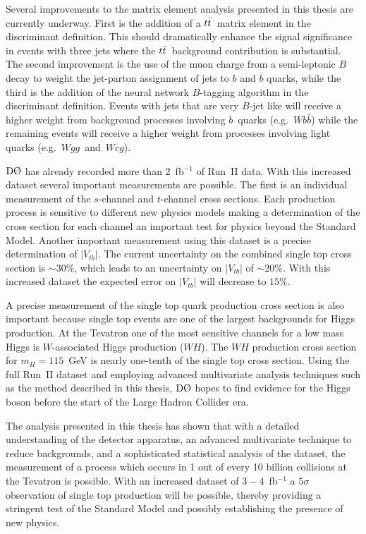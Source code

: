 Several improvements to the matrix element analysis presented in this thesis are currently underway. First is the addition of a $\mbox{$t\bar{t}$}$~matrix element in the discriminant definition. This should dramatically enhance the signal significance in events with three jets where the $\mbox{$t\bar{t}$}$~background contribution is substantial. The second improvement is the use of the muon charge from a semi-leptonic $B$ decay to weight the jet-parton assignment of jets to $b$ and $\bar{b}$ quarks, while the third is the addition of the neural network $B$-tagging algorithm in the discriminant definition. Events with jets that are very $B$-jet like will receive a higher weight from background processes involving $b$~quarks \mbox{(e.g. $Wb\bar{b}$)} while the remaining events will receive a higher weight from processes involving light quarks \mbox{(e.g. $Wgg$ and $Wcg$)}.

$\dzero$ has already recorded more than $2$~fb$^{-1}$ of Run~II data. With this increased dataset several important measurements are possible. The first is an individual measurement of the $s$-channel and $t$-channel cross sections. Each production process is sensitive to different new physics models making a determination of the cross section for each channel an important test for physics beyond the Standard Model. Another important measurement using this dataset is a precise determination of $|V_{tb}|$. The current uncertainty on the combined single top cross section is $\sim30\%$, which leads to an uncertainty on $|V_{tb}|$ of $\sim20\%$. With this increased dataset the expected error on $|V_{tb}|$ will decrease to $15\%$. 

A precise measurement of the single top quark production cross section is also important because single top events are one of the largest backgrounds for Higgs production. At the Tevatron one of the most sensitive channels for a low mass Higgs is $W$-associated Higgs production ($WH$). The $WH$ production cross section for $m_{H}=115$~GeV is nearly one-tenth of the single top cross section. Using the full Run~II dataset and employing advanced multivariate analysis techniques such as the method described in this thesis, $\dzero$ hopes to find evidence for the Higgs boson before the start of the Large Hadron Collider era.

The analysis presented in this thesis has shown that with a detailed understanding of the detector apparatus, an advanced multivariate technique to reduce backgrounds, and a sophisticated statistical analysis of the dataset, the measurement of a process which occurs in 1 out of every 10 billion collisions at the Tevatron is possible. With an increased dataset of $3-4$~fb$^{-1}$ a $5\sigma$ observation of single top production will be possible, thereby providing a stringent test of the Standard Model and possibly establishing the presence of new physics.